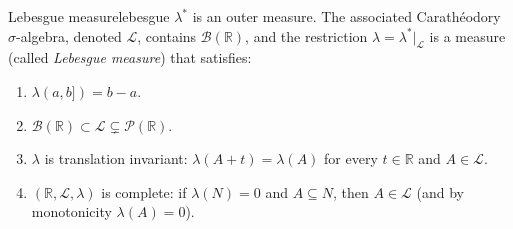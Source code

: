 \documentclass[11pt, a4paper]{article}
\begin{document}
\begin{teorema}{Lebesgue measure}{lebesgue}
$\lambda^*$ is an outer measure. The associated Carathéodory $\sigma$-algebra, denoted
$\mathcal{L}$, contains $\mathcal{B}(\mathbb{R})$, and the restriction $\lambda =
\lambda^*|_{\mathcal{L}}$ is a measure (called \emph{Lebesgue measure}) that satisfies:
\begin{enumerate}
    \item $\lambda(a, b]) = b - a$.
    \item $\mathcal{B}(\mathbb{R}) \subset \mathcal{L} \subsetneq \mathcal{P}(\mathbb{R})$.
    \item $\lambda$ is translation invariant: $\lambda(A + t) = \lambda(A)$ for every $t \in
    \mathbb{R}$ and $A \in \mathcal{L}$.
    \item $(\mathbb{R}, \mathcal{L}, \lambda)$ is complete: if $\lambda(N) = 0$ and $A \subseteq N$,
    then $A \in \mathcal{L}$ (and by monotonicity $\lambda(A) = 0$).
\end{enumerate}
\end{teorema}
\end{document}
